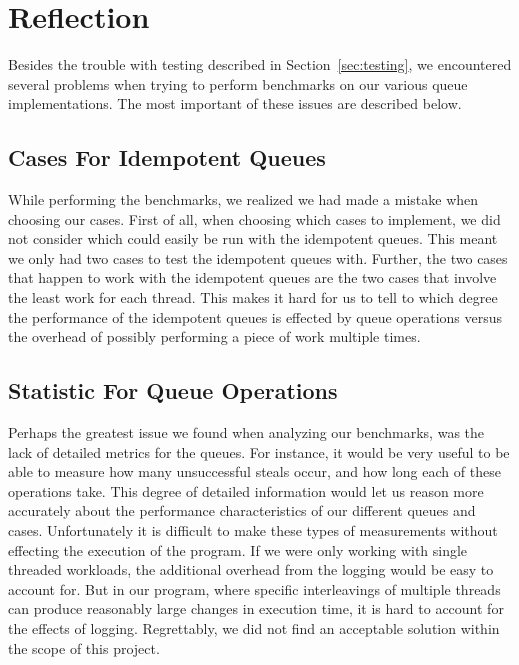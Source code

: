 \section{Reflection}
\label{sec:Reflection}
Besides the trouble with testing described in Section~\ref{sec:testing}, we
encountered several problems when trying to perform benchmarks on our various
queue implementations. The most important of these issues are described below.
 
\subsection{Cases For Idempotent Queues}
\label{sub:cases_for_idempotent_queues}
While performing the benchmarks, we realized we had made a mistake when
choosing our cases. First of all, when choosing which cases to implement, we
did not consider which could easily be run with the idempotent queues. This
meant we only had two cases to test the idempotent queues with. Further, the
two cases that happen to work with the idempotent queues are the two cases
that involve the least work for each thread. This makes it hard for us to tell
to which degree the performance of the idempotent queues is effected by queue
operations versus the overhead of possibly performing a piece of work multiple
times.

\subsection{Statistic For Queue Operations}
\label{sub:statistic_for_queue_operations}
Perhaps the greatest issue we found when analyzing our benchmarks, was the lack
of detailed metrics for the queues. For instance, it would be very useful to be
able to measure how many unsuccessful steals occur, and how long each of these
operations take. This degree of detailed information would let us reason more
accurately about the performance characteristics of our different queues and
cases. Unfortunately it is difficult to make these types of measurements
without effecting the execution of the program. If we were only working with
single threaded workloads, the additional overhead from the logging would be
easy to account for. But in our program, where specific interleavings of
multiple threads can produce reasonably large changes in execution time, it is
hard to account for the effects of logging. Regrettably, we did not find an
acceptable solution within the scope of this project.
